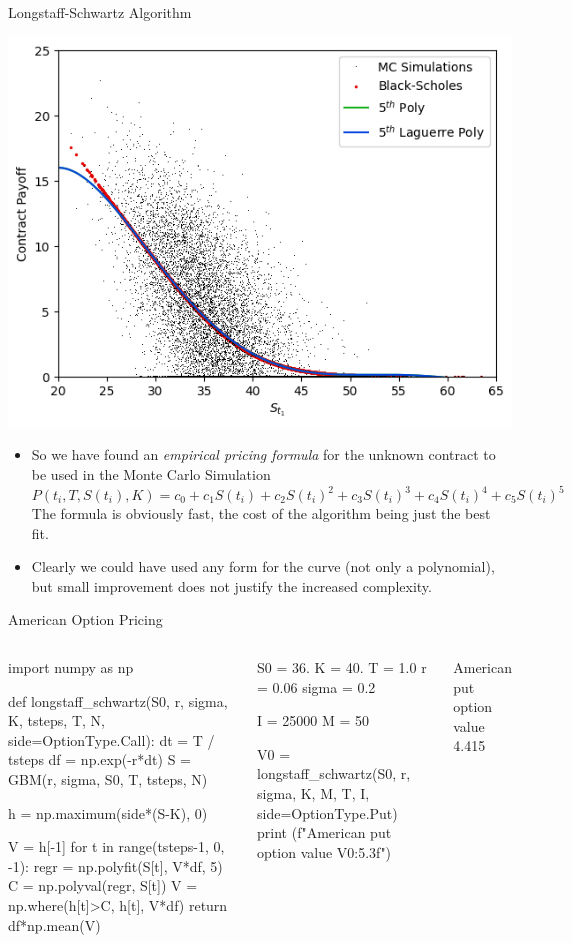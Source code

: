 \documentclass{beamer}
\begin{document}
\begin{frame}{Longstaff-Schwartz Algorithm}
\begin{center}
    \includegraphics[width=0.35\linewidth]{images/longstaff_scatter_2}
\end{center}

\begin{itemize}
    \item So we have found an \emph{empirical pricing formula} for the unknown contract to be used in the Monte Carlo Simulation
\begin{equation}
	P(t_i,T,S(t_i),K)=c_0+c_1 S(t_i) + c_2 S(t_i)^2 + c_3 S(t_i)^3 + c_4 S(t_i)^4 + c_5 S(t_i)^5
\end{equation}
    The formula is obviously fast, the cost of the algorithm being just the best fit. 
    \item Clearly we could have used any form for the curve (not only a polynomial), but small improvement does not justify the increased complexity.
\end{itemize}
\end{frame}

\begin{frame}[fragile]{American Option Pricing}
\begin{columns}
\begin{ipython}
import numpy as np

def longstaff_schwartz(S0, r, sigma, K, 
                       tsteps, T, N, side=OptionType.Call):
    dt = T / tsteps
    df = np.exp(-r*dt)
    S = GBM(r, sigma, S0, T, tsteps, N)

    h = np.maximum(side*(S-K), 0)

    V = h[-1]
    for t in range(tsteps-1, 0, -1):
        regr = np.polyfit(S[t], V*df, 5)
        C = np.polyval(regr, S[t])
        V = np.where(h[t]>C, h[t], V*df)
    return df*np.mean(V)    
\end{ipython}
\vspace{2.5cm}
\begin{ipython}
S0 = 36.
K = 40.
T = 1.0
r = 0.06
sigma = 0.2

I = 25000
M = 50

V0 = longstaff_schwartz(S0, r, sigma, 
                        K, M, T, I, side=OptionType.Put)
print (f"American put option value {V0:5.3f}")    
\end{ipython}
\begin{ioutput}

American put option value 4.415
\end{ioutput}
\end{columns}
\end{frame}
\end{document}
